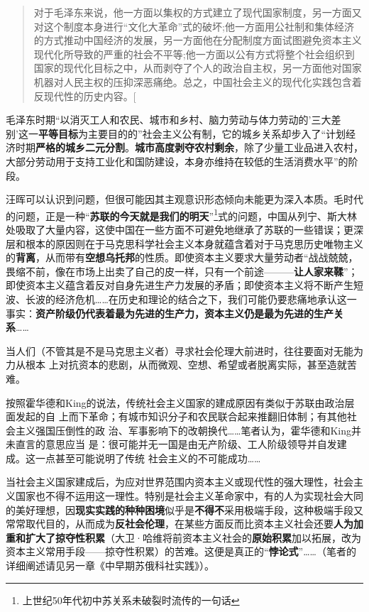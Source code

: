 \begin{quotation}
对于毛泽东来说，他一方面以集权的方式建立了现代国家制度，另一方面又对这个制度本身进行``文化大革命''式的破坏;他一方面用公社制和集体经济的方式推动中国经济的发展，另一方面他在分配制度方面试图避免资本主义现代化所导致的严重的社会不平等;他一方面以公有方式将整个社会组织到国家的现代化目标之中，从而剥夺了个人的政治自主权，另一方面他对国家机器对人民主权的压抑深恶痛绝。总之，中国社会主义的现代化实践包含着反现代性的历史内容。{[}\cite{wangxiandai}
\end{quotation}

毛泽东时期``以消灭工人和农民、城市和乡村、脑力劳动与体力劳动的'三大差别'这一\textbf{平等目标}为主要目的的''社会主义公有制，它的城乡关系却步入了``计划经济时期\textbf{严格的城乡二元分割}。\textbf{城市高度剥夺农村剩余}，除了少量工业品进入农村，大部分劳动用于支持工业化和国防建设，本身亦维持在较低的生活消费水平''\cite{yangkongjian}的阶段。

汪晖可以认识到问题，但很可能因其主观意识形态倾向未能更为深入本质。毛时代的问题，正是一种``\textbf{苏联的今天就是我们的明天}''\footnote{上世纪50年代初中苏关系未破裂时流传的一句话}式的问题，中国从列宁、斯大林处吸取了大量内容，这使中国在一些方面不可避免地继承了苏联的一些错误；更深层和根本的原因则在于马克思科学社会主义本身就蕴含着对于马克思历史唯物主义的\textbf{背离}，从而带有\textbf{空想乌托邦}的性质。即使资本主义要求大量劳动者``战战兢兢，畏缩不前，像在市场上出卖了自己的皮一样，只有一个前途---------\textbf{让人家来鞣}''；即使资本主义蕴含着反对自身先进生产力发展的矛盾；即使资本主义将不断产生短波、长波的经济危机\ldots{}\ldots{}在历史和理论的结合之下，我们可能仍要悲痛地承认这一事实：\textbf{资产阶级仍代表着最为先进的生产力，资本主义仍是最为先进的生产关系}\ldots{}\ldots{}

当人们（不管其是不是马克思主义者）寻求社会伦理大前进时，往往要面对无能为力从根本
上对抗资本的悲剧，从而微观、空想、希望或者脱离实际，甚至造就苦难。

按照霍华德和King的说法，传统社会主义国家的建成原因有类似于苏联由政治层面发起的自
上而下革命；有城市知识分子和农民联合起来推翻旧体制；有其他社会主义强国压倒性的政
治、军事影响下的改朝换代\ldots{}\ldots{}笔者认为，霍华德和King并未直言的意思应当
是：很可能并无一国是由无产阶级、工人阶级领导并自发建成。这一点甚至可能说明了传统
社会主义的不可能成功\ldots{}\ldots{}


当社会主义国家建成后，为应对世界范围内资本主义或现代性的强大理性，社会主义国家也不得不运用这一理性。特别是社会主义革命家中，有的人为实现社会大同的美好理想，因\textbf{现实实践的种种困境}似乎是\textbf{不得不}采用极端手段，这种极端手段又常常取代目的，从而成为\textbf{反社会伦理}，在某些方面反而比资本主义社会还要\textbf{人为加重和扩大了掠夺性积累}（大卫·哈维将前资本主义社会的\textbf{原始积累}加以拓展，改为资本主义常用手段------掠夺性积累）的苦难。这便是真正的``\textbf{悖论式}''\ldots{}\ldots{}（笔者的详细阐述请见另一章《中早期苏俄科社实践》）。


